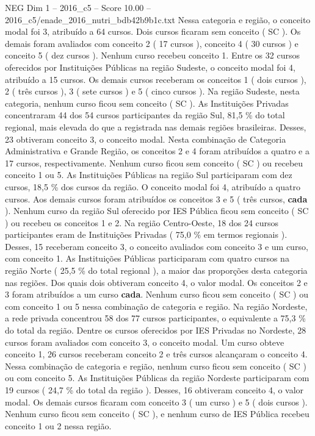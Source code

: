 \begin{textsample}{NEG Dim 1 – 2016\_c5 – Score 10.00 – 2016\_c5/enade\_2016\_nutri\_bdb42b9b1c.txt}
Nessa categoria e região, o conceito modal foi 3, atribuído a 64 cursos.
Dois cursos ficaram sem conceito ( SC ).
Os demais foram avaliados com conceito 2 ( 17 cursos ), conceito 4 ( 30 cursos ) e conceito 5 ( dez cursos ).
Nenhum curso recebeu conceito 1.
Entre os 32 cursos oferecidos por Instituições Públicas na região Sudeste, o conceito modal foi 4, atribuído a 15 cursos.
Os demais cursos receberam os conceitos 1 ( dois cursos ), 2 ( três cursos ), 3 ( sete cursos ) e 5 ( cinco cursos ).
Na região Sudeste, nesta categoria, nenhum curso ficou sem conceito ( SC ).
As Instituições Privadas concentraram 44 dos 54 cursos participantes da região Sul, 81,5 \% do total regional, mais elevada do que a registrada nas demais regiões brasileiras.
Desses, 23 obtiveram conceito 3, o conceito modal.
Nesta combinação de Categoria Administrativa e Grande Região, os conceitos 2 e 4 foram atribuídos a quatro e a 17 cursos, respectivamente.
Nenhum curso ficou sem conceito ( SC ) ou recebeu conceito 1 ou 5.
As Instituições Públicas na região Sul participaram com dez cursos, 18,5 \% dos cursos da região.
O conceito modal foi 4, atribuído a quatro cursos.
Aos demais cursos foram atribuídos os conceitos 3 e 5 ( três cursos, \textbf{cada} ).
Nenhum curso da região Sul oferecido por IES Pública ficou sem conceito ( SC ) ou recebeu os conceitos 1 e 2.
Na região Centro-Oeste, 18 dos 24 cursos participantes eram de Instituições Privadas ( 75,0 \% em termos regionais ).
Desses, 15 receberam conceito 3, o conceito avaliados com conceito 3 e um curso, com conceito 1.
As Instituições Públicas participaram com quatro cursos na região Norte ( 25,5 \% do total regional ), a maior das proporções desta categoria nas regiões.
Dos quais dois obtiveram conceito 4, o valor modal.
Os conceitos 2 e 3 foram atribuídos a um curso \textbf{cada}.
Nenhum curso ficou sem conceito ( SC ) ou com conceito 1 ou 5 nessa combinação de categoria e região.
Na região Nordeste, a rede privada concentrou 58 dos 77 cursos participantes, o equivalente a 75,3 \% do total da região.
Dentre os cursos oferecidos por IES Privadas no Nordeste, 28 cursos foram avaliados com conceito 3, o conceito modal.
Um curso obteve conceito 1, 26 cursos receberam conceito 2 e três cursos alcançaram o conceito 4.
Nessa combinação de categoria e região, nenhum curso ficou sem conceito ( SC ) ou com conceito 5.
As Instituições Públicas da região Nordeste participaram com 19 cursos ( 24,7 \% do total da região ).
Desses, 16 obtiveram conceito 4, o valor modal.
Os demais cursos ficaram com conceito 3 ( um curso ) e 5 ( dois cursos ).
Nenhum curso ficou sem conceito ( SC ), e nenhum curso de IES Pública recebeu conceito 1 ou 2 nessa região.

\end{textsample}
